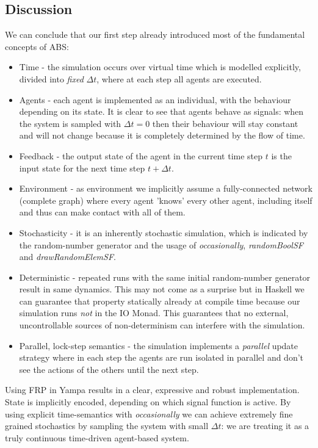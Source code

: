 \subsection{Discussion}
We can conclude that our first step already introduced most of the fundamental concepts of ABS:
\begin{itemize}
	\item Time - the simulation occurs over virtual time which is modelled explicitly, divided into \textit{fixed} $\Delta t$, where at each step all agents are executed.
	\item Agents - each agent is implemented as an individual, with the behaviour depending on its state. It is clear to see that agents behave as signals: when the system is sampled with $\Delta t = 0$ then their behaviour will stay constant and will not change because it is completely determined by the flow of time. 
	\item Feedback - the output state of the agent in the current time step $t$ is the input state for the next time step $t + \Delta t$.
	\item Environment - as environment we implicitly assume a fully-connected network (complete graph) where every agent 'knows' every other agent, including itself and thus can make contact with all of them.
	\item Stochasticity - it is an inherently stochastic simulation, which is indicated by the random-number generator and the usage of \textit{occasionally}, \textit{randomBoolSF} and \textit{drawRandomElemSF}.
	\item Deterministic - repeated runs with the same initial random-number generator result in same dynamics. This may not come as a surprise but in Haskell we can guarantee that property statically already at compile time because our simulation runs \textit{not} in the IO Monad. This guarantees that no external, uncontrollable sources of non-determinism can interfere with the simulation.
	\item Parallel, lock-step semantics - the simulation implements a \textit{parallel} update strategy where in each step the agents are run isolated in parallel and don't see the actions of the others until the next step.
\end{itemize}

Using FRP in Yampa results in a clear, expressive and robust implementation. State is implicitly encoded, depending on which signal function is active. By using explicit time-semantics with \textit{occasionally} we can achieve extremely fine grained stochastics by sampling the system with small $\Delta t$: we are treating it as a truly continuous time-driven agent-based system.

